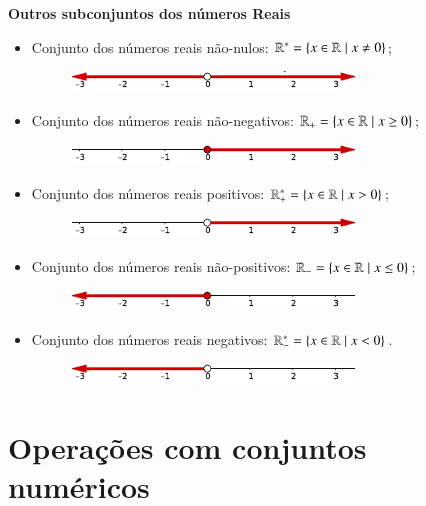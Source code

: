 \textbf{Outros subconjuntos dos números Reais}
\begin{itemize}
 \item Conjunto dos números reais não-nulos: $\mathbb{R}^{*}=\{x \in \mathbb{R} \mid x \neq 0\}$;
 \begin{figure}[H]
 \centering
 \includegraphics[width=7.5cm]{../Topicos/Figuras/n-nulos.pdf}
 \end{figure}
 \item Conjunto dos números reais não-negativos: $\mathbb{R}_{+}=\{x \in \mathbb{R} \mid x \geq 0\}$;
 \begin{figure}[H]
 \centering
 \includegraphics[width=7.5cm]{../Topicos/Figuras/n-negativos.pdf}
 \end{figure}
 \item Conjunto dos números reais positivos: $\mathbb{R}^{*}_{+}=\{x \in \mathbb{R} \mid x > 0\}$;
 \begin{figure}[H]
 \centering
 \includegraphics[width=7.5cm]{../Topicos/Figuras/positivos.pdf}
 \end{figure}
 \item Conjunto dos números reais não-positivos: $\mathbb{R}_{-}=\{x \in \mathbb{R} \mid x \leq 0\}$;
 \begin{figure}[H]
 \centering
 \includegraphics[width=7.5cm]{../Topicos/Figuras/n-positivos.pdf}
 \end{figure}
 \item Conjunto dos números reais negativos: $\mathbb{R}^{*}_{-}=\{x \in \mathbb{R} \mid x < 0\}$.
 \begin{figure}[H]
 \centering
 \includegraphics[width=7.5cm]{../Topicos/Figuras/negativos.pdf}
 \end{figure}
\end{itemize}

\section{Operações com conjuntos numéricos}


